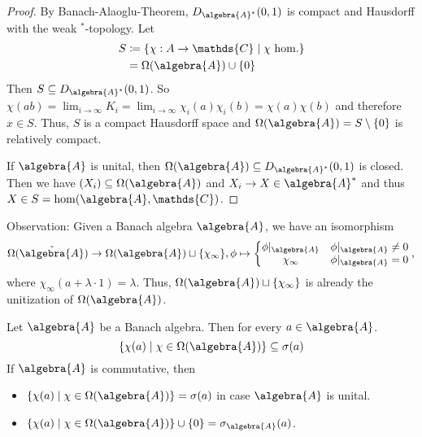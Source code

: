 \documentclass[a4paper]{article}
\begin{document}
\begin{proof}
	By Banach-Alaoglu-Theorem, $D_{\algebra{A}^*}(0,1)$ is compact and Hausdorff with the weak $^*$-topology.
	Let
	\begin{align*}
		S &\coloneq \{\chi: A \to \mathds{C} \mid \chi \text{ hom.} \}\\
		&= \Omega(\algebra{A}) \cup \{0\}
	\end{align*}
	Then $S \subseteq D_{\algebra{A}^*}(0,1)$.
	So $\chi(ab) = \lim_{i \to \infty} K_i = \lim_{i \to \infty} \chi_i(a) \chi_i(b) = \chi(a) \chi(b)$ and therefore $x \in S$.
	Thus, $S$ is a compact Hausdorff space and $\Omega(\algebra{A}) = S \setminus \{0\}$ is relatively compact.

	If $\algebra{A}$ is unital, then $\Omega(\algebra{A}) \subseteq D_{\algebra{A}^*}(0,1)$ is closed. Then we have $(X_i) \subseteq \Omega(\algebra{A})$ and $X_i \to X \in \algebra{A}^*$ and thus $X \in S = \hom(\algebra{A}, \mathds{C})$.
\end{proof}

Observation: Given a Banach algebra $\algebra{A}$, we have an isomorphism
\begin{equation*}
	\Omega(\tilde{\algebra{A}}) \to \Omega(\algebra{A}) \sqcup \{ \chi_\infty\}, \phi \mapsto \left\{  \begin{matrix}
		\phi|_\algebra{A} & \phi|_{\algebra{A}} \neq 0\\
		\chi_\infty & \phi|_\algebra{A} = 0
	\end{matrix}\right. \text{,} \label{obs:unitization_iso}
\end{equation*}
where $\chi_\infty(a + \lambda \cdot 1) = \lambda$. Thus, $\Omega(\algebra{A}) \sqcup \{\chi_\infty\}$ is already the unitization of $\Omega(\algebra{A})$. 

\begin{theorem}
	Let $\algebra{A}$ be a Banach algebra. Then for every $a \in \algebra{A}$.
	\begin{equation*}
		\{ \chi (a) \mid \chi \in \Omega(\algebra{A}) \} \subseteq \sigma(a)
	\end{equation*}
	If $\algebra{A}$ is commutative, then
	\begin{itemize}
		\item $\{ \chi(a) \mid \chi \in \Omega(\algebra{A})\} = \sigma(a)$ in case $\algebra{A}$ is unital.
		\item $\{ \chi(a) \mid \chi \in \Omega(\algebra{A})\} \cup \{0\} = \sigma_{\algebra{A}}(a)$.
	\end{itemize}
\end{theorem}
\end{document}
